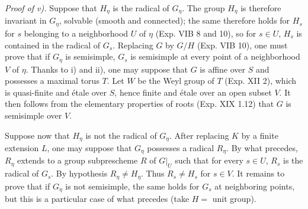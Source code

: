 \par\noindent\emph{Proof of v).} Suppose that $H_\eta$ is the radical of $G_\eta$. The group $H_\eta$ is therefore invariant in $G_\eta$, solvable (smooth and connected); the same therefore holds for $H_s$ for $s$ belonging to a neighborhood $U$ of $\eta$ (Exp. VIB 8 and 10), so for $s\in U$, $H_s$ is contained in the radical of $G_s$. Replacing $G$ by $G/H$ (Exp. VIB 10), one must prove that if $G_\eta$ is semisimple, $G_s$ is semisimple at every point of a neighborhood $V$ of $\eta$. Thanks to i) and ii), one may suppose that $G$ is affine over $S$ and possesses a maximal torus $T$. Let $W$ be the Weyl group of $T$ (Exp. XII 2), which is quasi-finite and \'etale over $S$, hence finite and \'etale over an open subset $V$. It then follows from the elementary properties of roots (Exp. XIX 1.12) that $G$ is semisimple over $V$.

Suppose now that $H_\eta$ is not the radical of $G_\eta$. After replacing $K$ by a finite extension $L$, one may suppose that $G_\eta$ possesses a radical $R_\eta$. By what precedes, $R_\eta$ extends to a group subprescheme $R$ of $G|_U$ such that for every $s\in U$, $R_s$ is the radical of $G_s$. By hypothesis $R_\eta\ne H_\eta$. Thus $R_s\ne H_s$ for $s\in V$. It remains to prove that if $G_\eta$ is not semisimple, the same holds for $G_s$ at neighboring points, but this is a particular case of what precedes (take $H=$ unit group).

